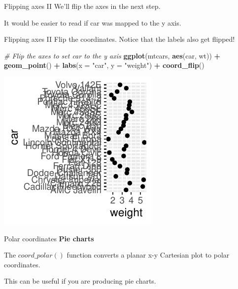 \documentclass[
  ignorenonframetext,
]{beamer}
\newenvironment{Shaded}{\begin{snugshade}}{\end{snugshade}}
\newcommand{\AttributeTok}[1]{\textcolor[rgb]{0.13,0.29,0.53}{#1}}
\newcommand{\CommentTok}[1]{\textcolor[rgb]{0.56,0.35,0.01}{\textit{#1}}}
\newcommand{\FunctionTok}[1]{\textcolor[rgb]{0.13,0.29,0.53}{\textbf{#1}}}
\newcommand{\NormalTok}[1]{#1}
\newcommand{\SpecialCharTok}[1]{\textcolor[rgb]{0.81,0.36,0.00}{\textbf{#1}}}
\newcommand{\StringTok}[1]{\textcolor[rgb]{0.31,0.60,0.02}{#1}}
\begin{document}
\begin{frame}{Flipping axes II}
\label{flipping-axes-ii-3}
We'll flip the axes in the next step.

It would be easier to read if car was mapped to the y axis.
\end{frame}

\begin{frame}[fragile]{Flipping axes II}
\label{flipping-axes-ii-4}
Flip the coordinates. Notice that the labels also get flipped!


\begin{Shaded}
\begin{Highlighting}[]
\CommentTok{\# Flip the axes to set car to the y axis}
\FunctionTok{ggplot}\NormalTok{(mtcars, }\FunctionTok{aes}\NormalTok{(car, wt)) }\SpecialCharTok{+} \FunctionTok{geom\_point}\NormalTok{() }\SpecialCharTok{+} \FunctionTok{labs}\NormalTok{(}\AttributeTok{x =} \StringTok{"car"}\NormalTok{,}
    \AttributeTok{y =} \StringTok{"weight"}\NormalTok{) }\SpecialCharTok{+} \FunctionTok{coord\_flip}\NormalTok{()}
\end{Highlighting}
\end{Shaded}

\begin{center}\includegraphics[width=0.5\linewidth]{Figs/unnamed-chunk-64-1} \end{center}
\end{frame}

\begin{frame}{Polar coordinates}
\label{polar-coordinates}
\textbf{Pie charts}

The \(coord\_polar()\) function converts a planar x-y Cartesian plot to
polar coordinates.

This can be useful if you are producing pie charts.
\end{frame}
\end{document}

